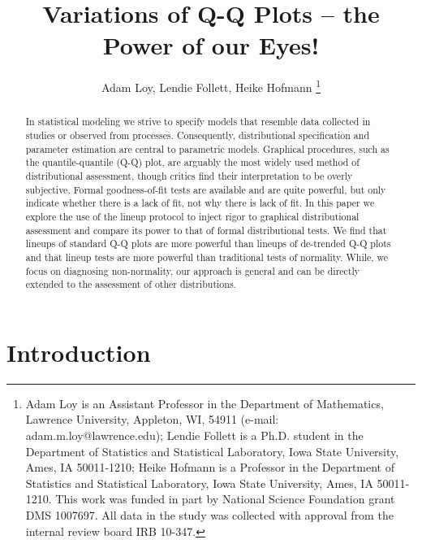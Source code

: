 \documentclass{article}\usepackage[]{graphicx}\usepackage[]{color}
\title{Variations of Q-Q Plots -- the Power of our Eyes!}
\author{Adam Loy, Lendie Follett, Heike Hofmann
\thanks{Adam Loy is an Assistant Professor in the Department of Mathematics, Lawrence University, Appleton, WI, 54911 (e-mail: adam.m.loy@lawrence.edu);  Lendie Follett is a Ph.D. student in the Department of Statistics and Statistical Laboratory, Iowa State University, Ames, IA 50011-1210; Heike Hofmann is a Professor in the Department of Statistics and Statistical Laboratory, Iowa State University, Ames, IA 50011-1210. This work was funded in part by National Science Foundation grant DMS 1007697. All data  in the study was collected  with approval from the internal review board IRB 10-347.}}
\begin{document}
\maketitle
\begin{abstract}
In statistical modeling we strive to specify models that resemble data collected in studies or observed from processes. Consequently, distributional specification and parameter estimation are central to parametric models. Graphical procedures, such as the quantile-quantile (Q-Q) plot, are arguably the most widely used method of distributional assessment, though critics find their interpretation to be overly subjective. Formal goodness-of-fit tests are available and are quite powerful, but only indicate whether there is a lack of fit, not why there is lack of fit. In this paper we explore the use of the lineup protocol to inject rigor to graphical distributional assessment and compare its power to that of formal distributional tests. We find that lineups of standard Q-Q plots are more powerful than lineups of de-trended Q-Q plots and that lineup tests are more powerful than traditional tests of normality. While, we focus on diagnosing non-normality, our approach is general and can be directly extended to the assessment of other distributions.
% 
% 
% 
\end{abstract}

\clearpage








\section{Introduction}
\end{document}

